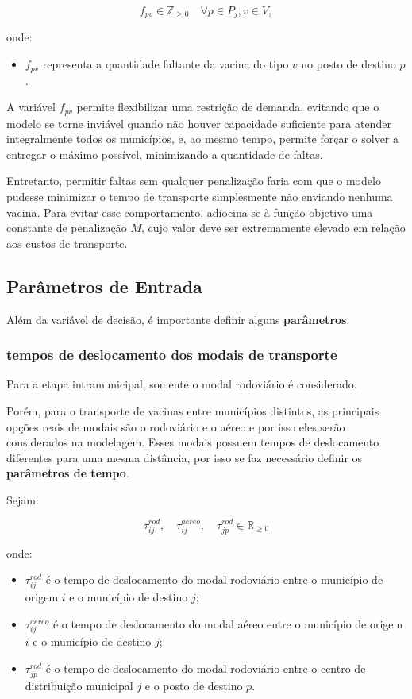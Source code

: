 \[
f_{pv} \in \mathbb{Z}_{\geq 0} \quad \forall p \in P_j, v \in V,
\]

onde:
\begin{itemize}
    \item $f_{pv}$ representa a quantidade faltante da vacina do tipo $v$ no posto de destino $p$.
\end{itemize}

A variável $f_{pv}$ permite flexibilizar uma restrição de demanda, evitando que o modelo se torne inviável quando não houver capacidade suficiente para atender integralmente todos os municípios, e, ao mesmo tempo, permite forçar o solver a entregar o máximo possível, minimizando a quantidade de faltas.

Entretanto, permitir faltas sem qualquer penalização faria com que o modelo pudesse minimizar o tempo de transporte simplesmente não enviando nenhuma vacina. Para evitar esse comportamento, adiocina-se à função objetivo uma constante de penalização $M$, cujo valor deve ser extremamente elevado em relação aos custos de transporte.


\subsection{Parâmetros de Entrada}


Além da variável de decisão, é importante definir alguns \textbf{parâmetros}.

\subsubsection{tempos de deslocamento dos modais de transporte}

Para a etapa intramunicipal, somente o modal rodoviário é considerado.

Porém, para o transporte de vacinas entre municípios distintos, as principais opções reais de modais são o rodoviário e o aéreo e por isso eles serão considerados na modelagem. Esses modais possuem tempos de deslocamento diferentes para uma mesma distância, por isso se faz necessário definir os \textbf{parâmetros de tempo}.

Sejam:

\[
\tau_{ij}^{rod}, \quad \tau_{ij}^{aereo},  \quad \tau_{jp}^{rod} \in \mathbb{R}_{\geq 0}
\]

onde:
\begin{itemize}
    \item $\tau_{ij}^{rod}$ é o tempo de deslocamento do modal rodoviário entre o município de origem $i$ e o município de destino $j$;
    \item $\tau_{ij}^{aereo}$ é o tempo de deslocamento do modal aéreo entre o município de origem $i$ e o município de destino $j$;
    \item $\tau_{jp}^{rod}$ é o tempo de deslocamento do modal rodoviário entre o centro de distribuição municipal $j$ e o posto de destino $p$. 
\end{itemize}

